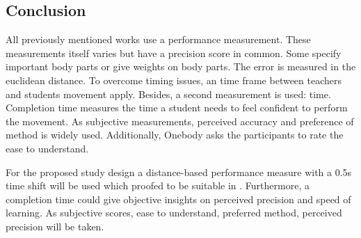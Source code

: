 \subsection{Conclusion}
All previously mentioned works use a performance measurement. These measurements itself varies but have a precision score in common. Some \cite{Anderson2013a}\cite{Chan2010}\cite{Tang2015}\cite{Sodhi2012} specify important body parts or give weights on body parts. The error is measured in the euclidean distance. To overcome timing issues, an time frame between teachers and students movement apply. Besides, a second measurement is used: time. Completion time measures the time a student needs to feel confident to perform the movement. As subjective measurements, perceived accuracy and preference of method is widely used. Additionally, Onebody asks the participants to rate the ease to understand. 
\begin{tcolorbox}[colback=red!30!white]
	For the proposed study design a distance-based performance measure with a 0.5s time shift will be used which proofed to be suitable in \cite{Anderson2013a}. Furthermore, a completion time could give objective insights on perceived precision and speed of learning. As subjective scores, ease to understand, preferred method, perceived precision will be taken.
\end{tcolorbox}

\newpage
